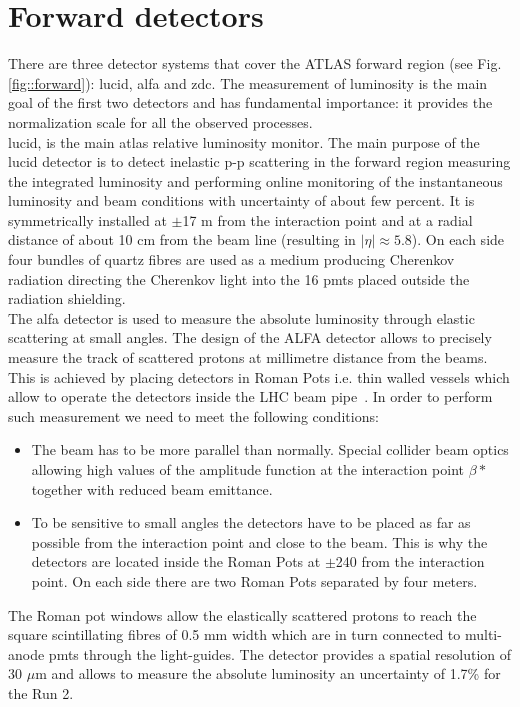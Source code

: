 \section{Forward detectors}
	There are three detector systems that cover the ATLAS forward region (see Fig. \ref{fig::forward}): \gls{lucid}, \gls{alfa} and \gls{zdc}. The measurement of luminosity is the main goal of the first two detectors and has fundamental importance: it provides the normalization scale for all the observed processes.\\
	 \gls{lucid}\cite{lucid_1}, \cite{lucid_2} is the main \gls{atlas} relative luminosity monitor. The main purpose of the \gls{lucid} detector is to detect inelastic p-p scattering in the forward region measuring the integrated luminosity and performing online monitoring of the instantaneous luminosity and beam conditions with uncertainty of about few percent. It is symmetrically installed at $\pm$17 m from the interaction point and at a radial distance of about 10 cm from the beam line (resulting in $|\eta| \approx 5.8$). On each side four bundles of quartz fibres are used as a medium producing Cherenkov radiation directing the Cherenkov light into the 16 \glspl{pmt} placed outside the radiation shielding. \\
	 The \gls{alfa}\cite{alfa} detector is used to measure the absolute luminosity through elastic scattering at small angles. The design of the ALFA detector allows to precisely measure the track of scattered protons at millimetre distance from the beams. This is achieved by placing detectors in Roman Pots i.e. thin walled vessels which allow to operate the detectors inside the LHC beam pipe~\cite{Amaldi:1972uw}. In order to perform such measurement we need to meet the following conditions: \\
	 \begin{itemize} 
	\item The beam has to be more parallel than normally. Special collider beam optics allowing high values of the amplitude function at the interaction point $\beta*$ together with reduced beam emittance. 
	\item To be sensitive to small angles the detectors have to be placed as far as possible from the interaction point and close to the beam. This is why the detectors are located inside the Roman Pots at $\pm$240 from the interaction point. On each side there are two Roman Pots separated by four meters.
 	\end{itemize}
 	The Roman pot windows allow the elastically scattered protons to reach the square scintillating fibres of 0.5 mm width which are in turn connected to multi-anode \glspl{pmt} through the light-guides. The detector provides a spatial resolution of 30 $\mu$m and allows to measure the absolute luminosity an uncertainty of 1.7\% for the Run 2\cite{luminosity}. \\
